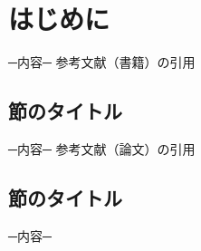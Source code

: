 \chapter{はじめに}
─内容─
参考文献（書籍）の引用\cite{book1}
\section{節のタイトル}
─内容─
参考文献（論文）の引用\cite{paper1}
\section{節のタイトル}
─内容─

